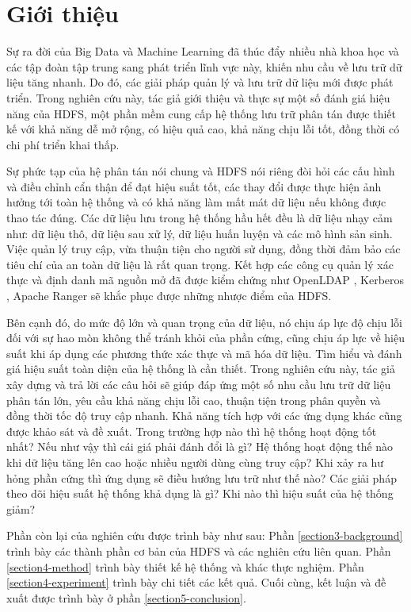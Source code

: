 \section{Giới thiệu}

Sự ra đời của Big Data và Machine Learning đã thúc đẩy nhiều nhà khoa học và các tập đoàn tập trung sang phát triển lĩnh vực này, khiến nhu cầu về lưu trữ dữ liệu tăng nhanh. Do đó, các giải pháp quản lý và lưu trữ dữ liệu mới được phát triển. Trong nghiên cứu này, tác giả giới thiệu và thực sự một số đánh giá hiệu năng của HDFS\cite{borthakur2007hadoop}, một phần mềm cung cấp hệ thống lưu trữ phân tán được thiết kế với khả năng dễ mở rộng, có hiệu quả cao, khả năng chịu lỗi tốt, đồng thời có chi phí triển khai thấp. 

Sự phức tạp của hệ phân tán nói chung và HDFS nói riêng đòi hỏi các cấu hình và điều chỉnh cẩn thận để đạt hiệu suất tốt, các thay đổi được thực hiện ảnh hưởng tới toàn hệ thống và có khả năng làm mất mát dữ liệu nếu không được thao tác đúng. Các dữ liệu lưu trong hệ thống hầu hết đều là dữ liệu nhạy cảm như: dữ liệu thô, dữ liệu sau xử lý, dữ liệu huấn luyện và các mô hình sản sinh. Việc quản lý truy cập, vừa thuận tiện cho người sử dụng, đồng thời đảm bảo các tiêu chí của an toàn dữ liệu là rất quan trọng. Kết hợp các công cụ quản lý xác thực và định danh mã nguồn mở đã được kiểm chứng như  OpenLDAP \cite{openLdap}, Kerberos \cite{bellovin1990limitations}, Apache Ranger \cite{ApacheRanger} sẽ khắc phục được những nhược điểm của HDFS.

Bên cạnh đó, do mức độ lớn và quan trọng của dữ liệu, nó chịu áp lực độ chịu lỗi đối với sự hao mòn không thể tránh khỏi của phần cứng, cũng chịu áp lực về hiệu suất khi áp dụng các phương thức xác thực và mã hóa dữ liệu. Tìm hiểu và đánh giá hiệu suất toàn diện của hệ thống là cần thiết. Trong nghiên cứu này, tác giả xây dựng và trả lời các câu hỏi sẽ giúp đáp ứng một số nhu cầu lưu trữ dữ liệu phân tán lớn, yêu cầu khả năng chịu lỗi cao, thuận tiện trong phân quyền và đồng thời tốc độ truy cập nhanh. Khả năng tích hợp với các ứng dụng khác cũng được khảo sát và đề xuất. Trong trường hợp nào thì hệ thống hoạt động tốt nhất? Nếu như vậy thì cái giá phải đánh đổi là gì? Hệ thống hoạt động thế nào khi dữ liệu tăng lên cao hoặc nhiều người dùng cùng truy cập? Khi xảy ra hư hỏng phần cứng thì ứng dụng sẽ điều hướng lưu trữ như thế nào? Các giải pháp theo dõi hiệu suất hệ thống khả dụng là gì? Khi nào thì hiệu suất của hệ thống giảm?

Phần còn lại của nghiên cứu được trình bày như sau: Phần \ref{section3-background} trình bày các thành phần cơ bản của HDFS và các nghiên cứu liên quan. Phần \ref{section4-method} trình bày thiết kế hệ thống và khác thực nghiệm. Phần \ref{section4-experiment} trình bày chi tiết các kết quả. Cuối cùng, kết luận và đề xuất được trình bày ở phần \ref{section5-conclusion}.